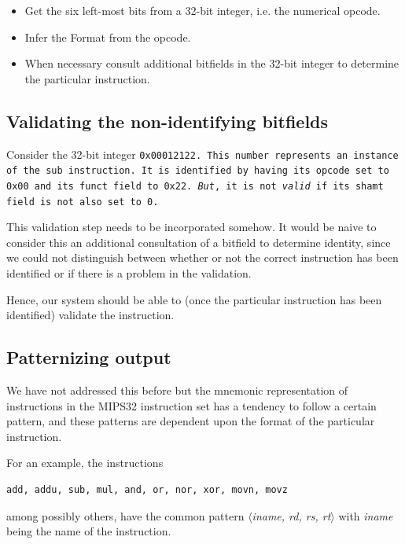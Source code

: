 \begin{itemize}
\item Get the six left-most bits from a 32-bit integer, i.e. the numerical opcode.
\item Infer the Format from the opcode.
\item When necessary consult additional bitfields in the 32-bit integer to
      determine the particular instruction.
\end{itemize}

\subsection{Validating the non-identifying bitfields}\label{section:validation}

Consider the 32-bit integer \tt{0x00012122}. This number represents an
instance of the \tt{sub} instruction. It is identified by
having its opcode set to \tt{0x00} and its funct field to \tt{0x22}.
\emph{But}, it is not \emph{valid} if its shamt field is not also set to 0.

This validation step needs to be incorporated somehow. It would be
naive to consider this an additional consultation of a bitfield to
determine identity, since we could not distinguish between whether or
not the correct instruction has been identified or if there is a
problem in the validation.

Hence, our system should be able to (once the particular instruction
has been identified) validate the instruction.

\subsection{Patternizing output}\label{section:patternizing}

We have not addressed this before but the mnemonic representation of
instructions in the MIPS32 instruction set has a tendency to follow a
certain pattern, and these patterns are dependent upon the format of
the particular instruction.

For an example, the instructions

\begin{verbatim}
add, addu, sub, mul, and, or, nor, xor, movn, movz
\end{verbatim}

\newcommand{\pattern}[1]{\emph{$\langle$#1$\rangle$}}
among possibly others, have the common pattern \pattern{iname, rd, rs,
rt} with \emph{iname} being the name of the instruction.

